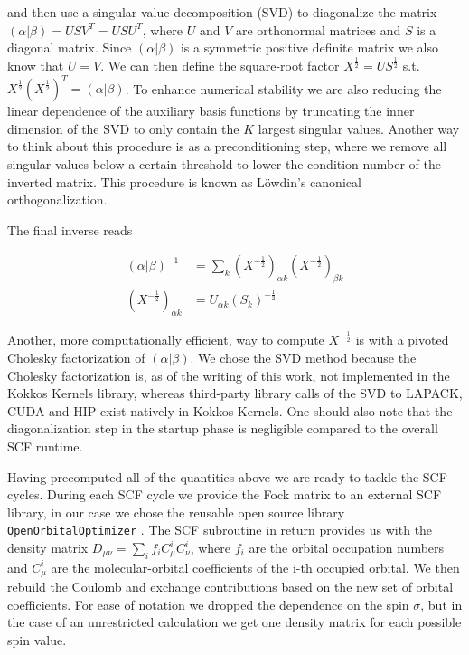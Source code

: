 \documentclass{article}
\begin{document}
and then use a singular value decomposition (SVD) to diagonalize the
matrix \( (\alpha | \beta ) = U S V^T = U S U^T\), where \( U \) and
\( V \) are orthonormal matrices and \( S \) is a diagonal matrix.
Since \( (\alpha | \beta ) \) is a symmetric positive definite matrix
we also know that \( U = V \).  We can then define the square-root
factor \( X^{\frac{1}{2}} = U S^{\frac{1}{2}} \) s.t. \(
X^{\frac{1}{2}}(X^{\frac{1}{2}})^T = (\alpha | \beta) \).
To enhance numerical stability we are also reducing the linear
dependence of the auxiliary basis functions by truncating the inner
dimension of the SVD to only contain the $K$ largest singular values.
Another way to think about this procedure is as a preconditioning
step, where we remove all singular values below a certain threshold
to lower the condition number of the inverted matrix. This procedure is known
as Löwdin's canonical orthogonalization.

The final inverse reads

\begin{align}
  (\alpha | \beta )^{-1}
  &= \sum_k (X^{-\frac{1}{2}})_{\alpha
  k}(X^{-\frac{1}{2}})_{\beta k }\\
  (X^{-\frac{1}{2}})_{\alpha k}
  &= U_{\alpha k} (S_k)^{-\frac{1}{2}}
\end{align}

Another, more computationally efficient, way to compute \(
X^{-\frac{1}{2}} \) is with a pivoted
Cholesky factorization of \( (\alpha | \beta  )\). We chose the SVD
method because the Cholesky factorization is, as of the writing of
this work, not implemented in the Kokkos Kernels library, whereas
third-party library calls of the SVD to LAPACK, CUDA and HIP exist natively in
Kokkos Kernels. One should
also note that the diagonalization step in the startup phase is negligible
compared to the overall SCF runtime.

Having precomputed all of the quantities above we are ready to tackle
the SCF cycles. During each SCF cycle we provide the Fock matrix to
an external SCF library, in our case we chose the reusable open source library
\texttt{OpenOrbitalOptimizer} \cite{Lehtola2025}. The SCF subroutine in
return provides us with the density matrix \( D_{\mu \nu } = \sum_i
f_i C_{\mu}^iC_{\nu }^i\), where \( f_i \) are the orbital occupation
numbers and \( C_{\mu}^i \) are the molecular-orbital coefficients
of the i-th occupied orbital. We then rebuild the Coulomb and
exchange contributions based on the new set of orbital coefficients.
For ease of notation we dropped the
dependence on the spin \( \sigma \), but in the case of an
unrestricted calculation we get one density matrix for each possible
spin value.
\end{document}
